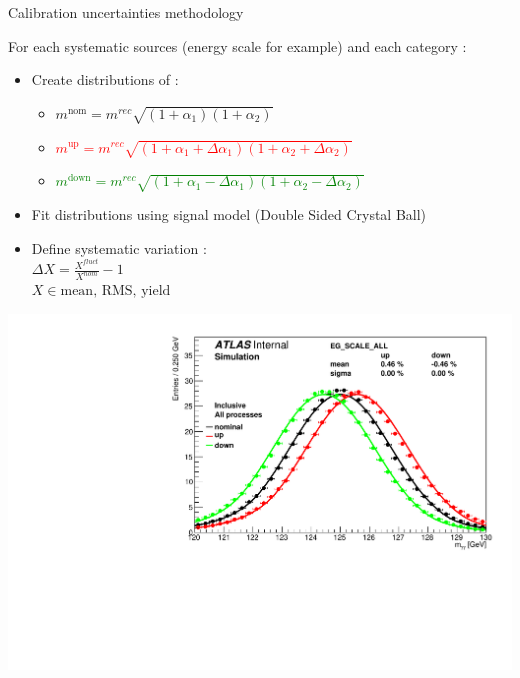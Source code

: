 \begin{frame}{Calibration uncertainties methodology}

      For each systematic sources (energy scale for example) and each category : 
      \begin{itemize}
      \item Create distributions of :
        \begin{itemize}
        \item $m^\text{nom} = m^{rec}\sqrt{(1+\alpha_1)(1+\alpha_2)}$
        \item \textcolor{red}{$m^\text{up} = m^{rec}\sqrt{(1+\alpha_1 + \Delta\alpha_1)(1+\alpha_2+\Delta\alpha_2)}$}
        \item \textcolor{green}{$m^\text{down} = m^{rec}\sqrt{(1+\alpha_1 - \Delta\alpha_1)(1+\alpha_2-\Delta\alpha_2)} $}
        \end{itemize}

      \end{itemize}

  \begin{minipage}{0.49\linewidth}
    \begin{itemize}
            \item Fit distributions using signal model (Double Sided Crystal Ball)
    \item Define systematic variation : \\$\Delta X = \frac{X^{fluct}}{X^{nom}}-1$ \\ $X\in {\text{mean, RMS, yield}}$
    \end{itemize}
    \end{minipage}
    \hfill
    \begin{minipage}{0.49\linewidth}
      \includegraphics[width=\linewidth]{Figures/h013_EG_SCALE_ALL_0.pdf}
    \end{minipage}

    \vfill
\end{frame}

